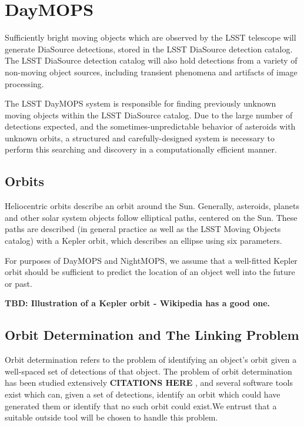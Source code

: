\section{DayMOPS}
\label{linking}

Sufficiently bright moving objects which are observed by the LSST
telescope will generate DiaSource detections, stored in the LSST
DiaSource detection catalog.  The LSST DiaSource detection catalog
will also hold detections from a variety of non-moving object sources,
including transient phenomena and artifacts of image processing.

The LSST DayMOPS system is responsible for finding previously unknown
moving objects within the LSST DiaSource catalog.  Due to the large
number of detections expected, and the sometimes-unpredictable
behavior of asteroids with unknown orbits, a structured and
carefully-designed system is necessary to perform this searching and
discovery in a computationally efficient manner.






\subsection{Orbits}
Heliocentric orbits describe an orbit around the Sun.  Generally,
asteroids, planets and other solar system objects follow elliptical
paths, centered on the Sun.  These paths are described (in general
practice as well as the LSST Moving Objects catalog) with a Kepler
orbit, which describes an ellipse using six parameters. 

For purposes of DayMOPS and NightMOPS, we assume that a well-fitted
Kepler orbit should be sufficient to predict the location of an object
well into the future or past.  

\textbf{TBD: Illustration of a Kepler orbit - Wikipedia has a good one.}


\subsection{Orbit Determination and The Linking Problem}
Orbit determination refers to the problem of identifying an object's
orbit given a well-spaced set of detections of that object.  The
problem of orbit determination has been studied extensively \textbf{
  CITATIONS HERE }, and several software tools exist which can, given
a set of detections, identify an orbit which could have generated them
or identify that no such orbit could exist.We entrust that a suitable
outside tool will be chosen to handle this problem.

